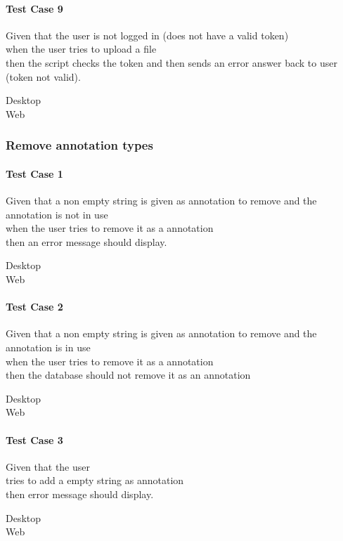 \paragraph*{Test Case 9}
Given that the user is not logged in (does not have a valid token) \\ when the user tries to upload a file \\ then the script checks the token and then sends an error answer back to user (token not valid).
\begin{description}
 \item[Desktop]
 \item[Web]
\end{description}


\subsubsection{Remove annotation types}
\paragraph*{Test Case 1}
Given that a non empty string is given as annotation to remove and the annotation is not in use \\ when the user tries to remove it as a annotation \\ then an error message should display.
\begin{description}
 \item[Desktop] \cmark
 \item[Web] \cmark
\end{description}
\paragraph*{Test Case 2}
Given that a non empty string is given as annotation to remove and the annotation is in use \\ when the user tries to remove it as a annotation \\ then the database should not remove it as an annotation
\begin{description}
 \item[Desktop] \cmark
 \item[Web]  \cmark
\end{description}
\paragraph*{Test Case 3}
Given that the user \\tries to add a empty string as annotation \\ then error message should display.
\begin{description}
 \item[Desktop] \cmark
 \item[Web] \cmark
\end{description}


